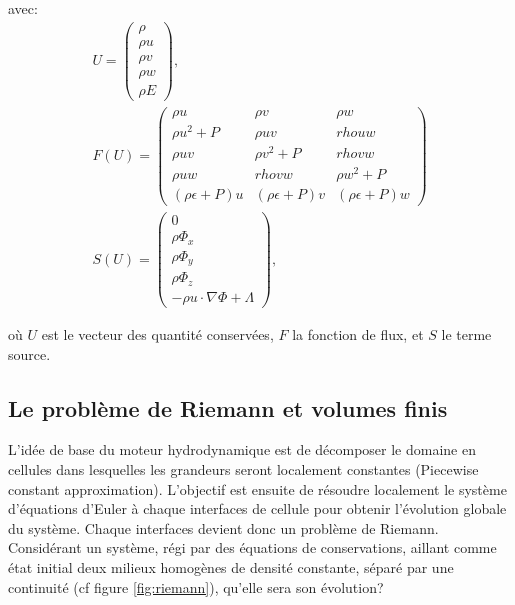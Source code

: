 avec:
\begin{equation}
\begin{array}{c}

U=
\left(
\begin{array}{c}
{ \rho}\\
{\rho u}\\
{\rho v}\\
{\rho w}\\
{\rho E}
\end{array}
\right),
\\
F(U)=
\left(
\begin{array}{ccc}
\rho u & \rho v & \rho w \\ 
\rho u^2 +P & \rho uv & rho uw \\ 
\rho uv & \rho v^2 +P & rho vw \\ 
\rho uw & rho vw &\rho w^2 +P \\ 
(\rho \epsilon + P)u & (\rho \epsilon + P)v & (\rho \epsilon + P)w
\end{array} 
\right)
\\
S(U) =
\left(
\begin{array}{c}
{ 0}\\
{\rho \Phi_x}\\
{\rho \Phi_y}\\
{\rho \Phi_z}\\
{- \rho u \cdot \nabla \Phi + \Lambda }
\end{array}
\right),
\end{array} 
\end{equation}

où $U$ est le vecteur des quantité conservées, $F$ la fonction de flux, et $S$ le terme source.

\subsection{Le problème de Riemann et volumes finis}

L'idée de base du moteur hydrodynamique est de décomposer le domaine en cellules dans lesquelles les grandeurs seront localement constantes (Piecewise constant approximation).
L'objectif est ensuite de résoudre localement le système d'équations d'Euler à chaque interfaces de cellule pour obtenir l'évolution globale du système.
Chaque interfaces devient donc un problème de Riemann.
Considérant un système, régi par des équations de conservations, aillant comme état initial deux milieux homogènes de densité constante, séparé par une continuité (cf figure \ref{fig:riemann}), qu'elle sera son évolution?


